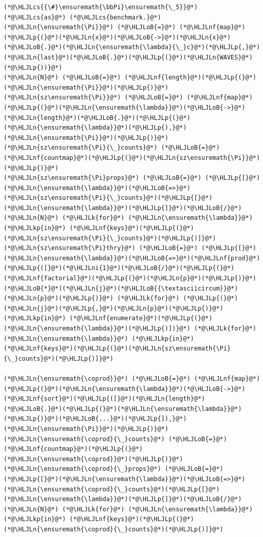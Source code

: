 \documentclass[12pt,a4paper]{article}
\newcommand{\HLJLk}[1]{\textcolor[RGB]{148,91,176}{\textbf{#1}}}
\newcommand{\HLJLkp}[1]{\textcolor[RGB]{148,91,176}{\textbf{#1}}}
\newcommand{\HLJLn}[1]{#1}
\newcommand{\HLJLnf}[1]{\textcolor[RGB]{66,102,213}{#1}}
\newcommand{\HLJLni}[1]{\textcolor[RGB]{59,151,46}{#1}}
\newcommand{\HLJLoB}[1]{\textcolor[RGB]{102,102,102}{\textbf{#1}}}
\newcommand{\HLJLp}[1]{#1}
\newcommand{\HLJLcs}[1]{\textcolor[RGB]{153,153,119}{\textit{#1}}}
\begin{document}
\begin{lstlisting}
(*@\HLJLcs{{\#}\ensuremath{\bbPi}\ensuremath{\_5}}@*) (*@\HLJLcs{as}@*) (*@\HLJLcs{benchmark.}@*)
(*@\HLJLn{\ensuremath{\Pi}}@*) (*@\HLJLoB{=}@*) (*@\HLJLnf{map}@*)(*@\HLJLp{(}@*)(*@\HLJLn{x}@*)(*@\HLJLoB{->}@*)(*@\HLJLn{x}@*)(*@\HLJLoB{.}@*)(*@\HLJLn{\ensuremath{\lambda}{\_}c}@*)(*@\HLJLp{,}@*) (*@\HLJLn{last}@*)(*@\HLJLoB{.}@*)(*@\HLJLp{(}@*)(*@\HLJLn{WAVES}@*)(*@\HLJLp{))}@*)
(*@\HLJLn{N}@*) (*@\HLJLoB{=}@*) (*@\HLJLnf{length}@*)(*@\HLJLp{(}@*)(*@\HLJLn{\ensuremath{\Pi}}@*)(*@\HLJLp{)}@*)
(*@\HLJLn{sz\ensuremath{\Pi}}@*) (*@\HLJLoB{=}@*) (*@\HLJLnf{map}@*)(*@\HLJLp{(}@*)(*@\HLJLn{\ensuremath{\lambda}}@*)(*@\HLJLoB{->}@*)(*@\HLJLn{length}@*)(*@\HLJLoB{.}@*)(*@\HLJLp{(}@*)(*@\HLJLn{\ensuremath{\lambda}}@*)(*@\HLJLp{),}@*) (*@\HLJLn{\ensuremath{\Pi}}@*)(*@\HLJLp{)}@*)
(*@\HLJLn{sz\ensuremath{\Pi}{\_}counts}@*) (*@\HLJLoB{=}@*) (*@\HLJLnf{countmap}@*)(*@\HLJLp{(}@*)(*@\HLJLn{sz\ensuremath{\Pi}}@*)(*@\HLJLp{)}@*)
(*@\HLJLn{sz\ensuremath{\Pi}props}@*) (*@\HLJLoB{=}@*) (*@\HLJLp{[}@*)(*@\HLJLn{\ensuremath{\lambda}}@*)(*@\HLJLoB{=>}@*)(*@\HLJLn{sz\ensuremath{\Pi}{\_}counts}@*)(*@\HLJLp{[}@*)(*@\HLJLn{\ensuremath{\lambda}}@*)(*@\HLJLp{]}@*)(*@\HLJLoB{/}@*)(*@\HLJLn{N}@*) (*@\HLJLk{for}@*) (*@\HLJLn{\ensuremath{\lambda}}@*) (*@\HLJLkp{in}@*) (*@\HLJLnf{keys}@*)(*@\HLJLp{(}@*)(*@\HLJLn{sz\ensuremath{\Pi}{\_}counts}@*)(*@\HLJLp{)]}@*)
(*@\HLJLn{sz\ensuremath{\Pi}thry}@*) (*@\HLJLoB{=}@*) (*@\HLJLp{[}@*)(*@\HLJLn{\ensuremath{\lambda}}@*)(*@\HLJLoB{=>}@*)(*@\HLJLnf{prod}@*)(*@\HLJLp{([}@*)(*@\HLJLni{1}@*)(*@\HLJLoB{/}@*)(*@\HLJLp{(}@*)(*@\HLJLnf{factorial}@*)(*@\HLJLp{(}@*)(*@\HLJLn{p}@*)(*@\HLJLp{)}@*)(*@\HLJLoB{*}@*)(*@\HLJLn{j}@*)(*@\HLJLoB{{\textasciicircum}}@*)(*@\HLJLn{p}@*)(*@\HLJLp{)}@*) (*@\HLJLk{for}@*) (*@\HLJLp{(}@*)(*@\HLJLn{j}@*)(*@\HLJLp{,}@*)(*@\HLJLn{p}@*)(*@\HLJLp{)}@*) (*@\HLJLkp{in}@*) (*@\HLJLnf{enumerate}@*)(*@\HLJLp{(}@*)(*@\HLJLn{\ensuremath{\lambda}}@*)(*@\HLJLp{)])}@*) (*@\HLJLk{for}@*) (*@\HLJLn{\ensuremath{\lambda}}@*) (*@\HLJLkp{in}@*) (*@\HLJLnf{keys}@*)(*@\HLJLp{(}@*)(*@\HLJLn{sz\ensuremath{\Pi}{\_}counts}@*)(*@\HLJLp{)]}@*)

(*@\HLJLn{\ensuremath{\coprod}}@*) (*@\HLJLoB{=}@*) (*@\HLJLnf{map}@*)(*@\HLJLp{(}@*)(*@\HLJLn{\ensuremath{\lambda}}@*)(*@\HLJLoB{->}@*)(*@\HLJLnf{sort}@*)(*@\HLJLp{([}@*)(*@\HLJLn{length}@*)(*@\HLJLoB{.}@*)(*@\HLJLp{(}@*)(*@\HLJLn{\ensuremath{\lambda}}@*)(*@\HLJLp{)}@*)(*@\HLJLoB{...}@*)(*@\HLJLp{]),}@*) (*@\HLJLn{\ensuremath{\Pi}}@*)(*@\HLJLp{)}@*)
(*@\HLJLn{\ensuremath{\coprod}{\_}counts}@*) (*@\HLJLoB{=}@*) (*@\HLJLnf{countmap}@*)(*@\HLJLp{(}@*)(*@\HLJLn{\ensuremath{\coprod}}@*)(*@\HLJLp{)}@*)
(*@\HLJLn{\ensuremath{\coprod}{\_}props}@*) (*@\HLJLoB{=}@*) (*@\HLJLp{[}@*)(*@\HLJLn{\ensuremath{\lambda}}@*)(*@\HLJLoB{=>}@*)(*@\HLJLn{\ensuremath{\coprod}{\_}counts}@*)(*@\HLJLp{[}@*)(*@\HLJLn{\ensuremath{\lambda}}@*)(*@\HLJLp{]}@*)(*@\HLJLoB{/}@*)(*@\HLJLn{N}@*) (*@\HLJLk{for}@*) (*@\HLJLn{\ensuremath{\lambda}}@*) (*@\HLJLkp{in}@*) (*@\HLJLnf{keys}@*)(*@\HLJLp{(}@*)(*@\HLJLn{\ensuremath{\coprod}{\_}counts}@*)(*@\HLJLp{)]}@*)
\end{lstlisting}
\end{document}
